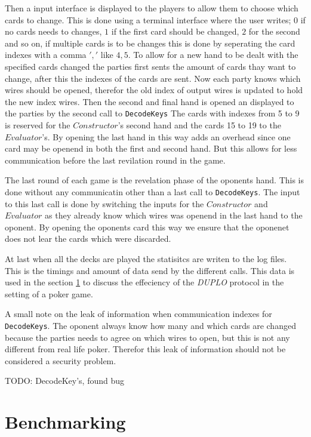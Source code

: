 \documentclass[twoside,11pt,openright]{report}
\newcommand{\todo}[1]{}
\renewcommand{\todo}[1]{{\color{red} TODO: {#1}} \\}
\newcommand{\DUPLO}{\textit{DUPLO} }
\begin{document}
Then a input interface is displayed to the players to allow them to choose which cards to change. This is done using a terminal interface where the user writes; $0$ if no cards needs to changes, $1$ if the first card should be changed, $2$ for the second and so on, if multiple cards is to be changes this is done by seperating the card indexes with a comma $','$ like $4,5$. To allow for a new hand to be dealt with the specified cards changed the parties first sents the amount of cards thay want to change, after this the indexes of the cards are sent. Now each party knows which wires should be opened, therefor the old index of output wires is updated to hold the new index wires. Then the second and final hand is opened an displayed to the parties by the second call to \verb|DecodeKeys| The cards with indexes from 5 to 9 is reserved for the $Constructor$'s second hand and the cards 15 to 19 to the $Evaluator$'s. By opening the last hand in this way adds an overhead since one card may be openend in both the first and second hand. But this allows for less communication before the last revilation round in the game.

The last round of each game is the revelation phase of the oponents hand. This is done without any communicatin other than a last call to \verb|DecodeKeys|. The input to this last call is done by switching the inputs for the $Constructor$ and $Evaluator$ as they already know which wires was openend in the last hand to the oponent. By opening the oponents card this way we ensure that the oponenet does not lear the cards which were discarded.

At last when all the decks are played the statisitcs are writen to the log files. This is the timings and amount of data send by the different calls. This data is used in the section \ref{sec:bechmarking} to discuss the effeciency of the \DUPLO protocol in the setting of a poker game.

\bigskip

A small note on the leak of information when communication indexes for \verb|DecodeKeys|. The oponent always know how many and which cards are changed because the parties needs to agree on which wires to open, but this is not any different from real life poker. Therefor this leak of information should not be considered a security problem.


\todo{DecodeKey's, found bug}


\section{Benchmarking}
\label{sec:bechmarking}
\end{document}
